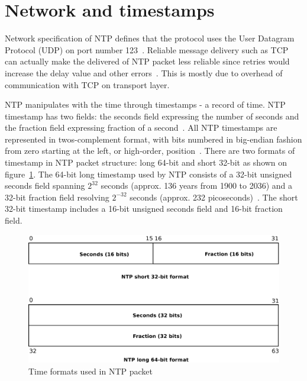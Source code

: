 
\section{Network and timestamps}\label{sec:ntp-network}
Network specification of NTP defines that
the protocol uses the User Datagram Protocol (UDP) on port number 123~\cite{ianna-ports,rfc5905}.
Reliable message delivery such as TCP can actually make the delivered of
NTP packet less reliable since retries
would increase the delay value and other errors~\cite{rfc5905}.
This is mostly due to overhead of communication with TCP on transport layer.

NTP manipulates with the time through timestamps - a record of time.
NTP timestamp has two fields: the seconds field expressing the number of seconds
and the fraction field expressing fraction of a second~\cite{rfc5905}.
All NTP timestamps are represented in twos-complement format, with
bits numbered in big-endian fashion from zero starting at the left, or high-order, position~\cite{rfc5905}. 
There are two formats of timestamp in NTP packet structure:
long 64-bit and short 32-bit as shown on figure~\ref{fig:ntp-timestamps}.
The 64-bit long timestamp used by NTP consists of a 32-bit unsigned seconds
field spanning $2^{32}$ seconds (approx. 136 years from 1900 to 2036) and a 32-bit fraction field resolving
$2^{-32}$ seconds (approx. 232 picoseconds)~\cite{rfc5905}.
The short 32-bit timestamp includes a 16-bit unsigned seconds field
and 16-bit fraction field.

\begin{figure}
	\centering
	\includegraphics[width=13cm,keepaspectratio]{fig/ntp-timestamps.pdf}
	\caption{Time formats used in NTP packet}
	\label{fig:ntp-timestamps}
	\bigskip
\end{figure}

